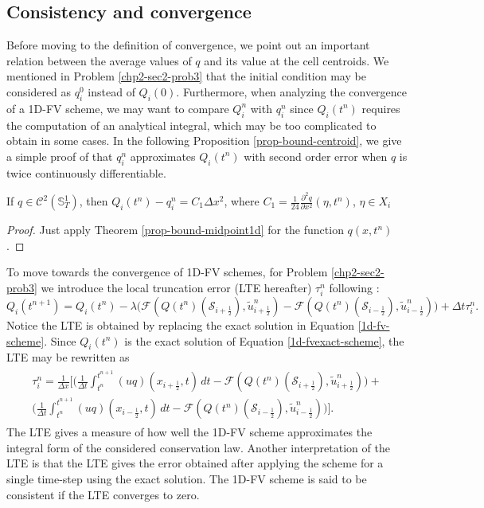 \subsection{Consistency and convergence}
\label{chp2-sub-CC}
Before moving to the definition of convergence, we point out an important relation
between the average values of $q$ and its value at the cell centroids.
We mentioned in Problem \ref{chp2-sec2-prob3} that the initial condition may be considered as $q_i^0$
instead of $Q_i(0)$. 
Furthermore, when analyzing the convergence of a 1D-FV scheme, we may 
want to compare $Q_i^n$ with $q_i^n$ since $Q_i(t^n)$ requires the computation of 
an analytical integral, which may be too complicated to obtain in some cases.
In the following Proposition \ref{prop-bound-centroid}, we give a simple proof
of that $q_i^n$ approximates $Q_i(t^n)$ with second order error when $q$ is twice
continuously differentiable.
\begin{prop}
	\label{prop-bound-centroid}
	If $q \in \mathcal{C}^2(\mathbb{S}_{T}^1)$, then $Q_i(t^n)-q_i^n = C_1 \Delta x^2$, where 
	$C_1 = \frac{1}{24}\frac{\partial^2 q}{\partial x^2} (\eta, t^n)$,  $\eta \in X_i$
\end{prop}
\begin{proof}
	Just apply Theorem \ref{prop-bound-midpoint1d} for the function $q(x,t^n)$.	
\end{proof}
To move towards the convergence of 1D-FV schemes, for  Problem \ref{chp2-sec2-prob3} we introduce the local truncation error (LTE hereafter)
$\tau_i^n$ following \citet{leveque:2002}:
\begin{equation}
	\label{consistency-1d-eq1}
	Q_i(t^{n+1}) = Q_i(t^n) - \lambda
	\bigg(\mathcal{F}(Q(t^n)(\mathcal{S}_{i+\frac{1}{2}}),\tilde{u}^n_{i+\frac{1}{2}})-
	\mathcal{F}(Q(t^n)(\mathcal{S}_{i-\frac{1}{2}}),\tilde{u}^n_{i-\frac{1}{2}}) \bigg) + \Delta t \tau_i^n.
\end{equation}
Notice the LTE is obtained by replacing the exact solution in Equation \eqref{1d-fv-scheme}.
Since $Q_i(t^n)$ is the exact solution of Equation \eqref{1d-fvexact-scheme}, 
the LTE may be rewritten as
\begin{align}
	\begin{split}
	\label{consistency-1d-eq2}
		\tau_{i}^n = 
		\frac{1}{\Delta x} \bigg[  \bigg( \frac{1}{\Delta t}\int_{t^{n}}^{t^{n+1}}
		{(uq)}(x_{i+\frac{1}{2}}, t) \,dt - \mathcal{F}(Q(t^n)(\mathcal{S}_{i+\frac{1}{2}} ),\tilde{u}^n_{i+\frac{1}{2}}) \bigg) +\\
		\bigg( \frac{1}{\Delta t}\int_{t^{n}}^{t^{n+1}}
		{(uq)}(x_{i-\frac{1}{2}}, t) \,dt - \mathcal{F}(Q(t^n)(\mathcal{S}_{i-\frac{1}{2}} ),\tilde{u}^n_{i-\frac{1}{2}}) \bigg)
		\bigg].
	\end{split}
\end{align}
The LTE gives a measure of how well the 1D-FV scheme approximates the integral form
of the considered conservation law. 
Another interpretation of the LTE is that the LTE gives the error obtained after applying
the scheme for a single time-step using the exact solution.
The 1D-FV scheme is said to be consistent
if the LTE converges to zero.


